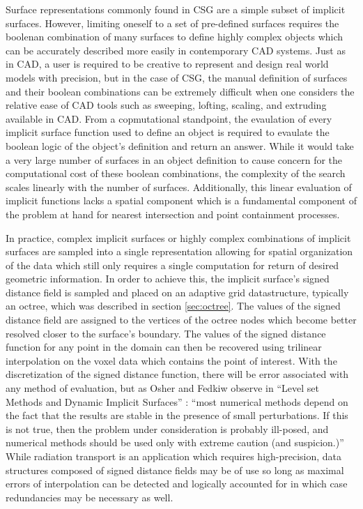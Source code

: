 \documentclass[12pt, a4paper]{article}
\begin{document}
Surface representations commonly found in CSG are a simple subset of implicit surfaces. However, limiting oneself to a set of pre-defined surfaces requires the boolenan combination of many surfaces to define highly complex objects which can be accurately described more easily in contemporary CAD systems. Just as in CAD, a user is required to be creative to represent and design real world models with precision, but in the case of CSG, the manual definition of surfaces and their boolean combinations can be extremely difficult when one considers the relative ease of CAD tools such as sweeping, lofting, scaling, and extruding available in CAD. From a copmutational standpoint, the evaulation of every implicit surface function used to define an object is required to evaulate the boolean logic of the object's definition and return an answer. While it would take a very large number of surfaces in an object definition to cause concern for the computational cost of these boolean combinations, the complexity of the search scales linearly with the number of surfaces. Additionally, this linear evaluation of implicit functions lacks a spatial component which is a fundamental component of the problem at hand for nearest intersection and point containment processes.

In practice, complex implicit surfaces or highly complex combinations of implicit surfaces are sampled into a single representation allowing for spatial organization of the data which still only requires a single computation for return of desired geometric information. In order to achieve this, the implicit surface's signed distance field is sampled and placed on an adaptive grid datastructure, typically an octree, which was described in section \ref{sec:octree}. The values of the signed distance field are assigned to the vertices of the octree nodes which become better resolved closer to the surface's boundary. The values of the signed distance function for any point in the domain can then be recovered using trilinear interpolation on the voxel data which contains the point of interest. With the discretization of the signed distance function, there will be error associated with any method of evaluation, but as Osher and Fedkiw observe in ``Level set Methods and Dynamic Implicit Surfaces'' \cite{Osher_2003}: ``most numerical methods depend on the fact that the results are stable in the presence of small perturbations. If this is not true, then the problem under consideration is probably ill-posed, and numerical methods should be used only with extreme caution (and suspicion.)'' While radiation transport is an application which requires high-precision, data structures composed of signed distance fields may be of use so long as maximal errors of interpolation can be detected and logically accounted for in which case redundancies may be necessary as well.
\end{document}
